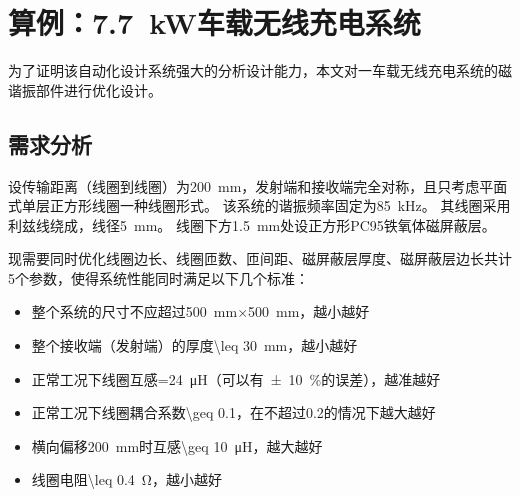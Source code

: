 \documentclass[index]{subfiles}
\begin{document}
\chapter{算例：\SI{7.7}{\kilo\watt}车载无线充电系统}\label{sec:example}
为了证明该自动化设计系统强大的分析设计能力，本文对一车载无线充电系统的磁谐振部件进行优化设计。

\section{需求分析}\label{sec:example-req}
设传输距离（线圈到线圈）为\SI{200}{\milli\metre}，发射端和接收端完全对称，且只考虑平面式单层正方形线圈一种线圈形式。
该系统的谐振频率固定为\SI{85}{\kilo\hertz}。
其线圈采用利兹线绕成，线径\SI{5}{\milli\metre}。
线圈下方\SI{1.5}{\milli\metre}处设正方形PC95铁氧体磁屏蔽层。

现需要同时优化线圈边长、线圈匝数、匝间距、磁屏蔽层厚度、磁屏蔽层边长共计5个参数，使得系统性能同时满足以下几个标准：
\begin{itemize}
  \item 整个系统的尺寸不应超过\SI{500}{\milli\metre}$\times$\SI{500}{\milli\metre}，越小越好
  \item 整个接收端（发射端）的厚度\SI{\leq 30}{\milli\metre}，越小越好
  \item 正常工况下线圈互感\SI{=24}{\micro\henry}（可以有\SI{\pm 10}{\percent}的误差），越准越好
  \item 正常工况下线圈耦合系数\num{\geq 0.1}，在不超过\num{0.2}的情况下越大越好
  \item 横向偏移\SI{200}{\milli\metre}时互感\SI{\geq 10}{\micro\henry}，越大越好
  \item 线圈电阻\SI{\leq 0.4}{\ohm}，越小越好
\end{itemize}
\end{document}
